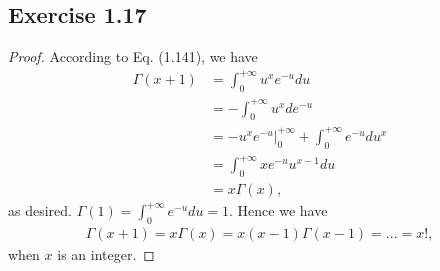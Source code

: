 \documentclass[11pt]{article}
\theoremstyle{definition}
\begin{document}
\subsection{Exercise 1.17}
\begin{proof}
According to Eq. (1.141), we have
\begin{align*}
\Gamma(x+1) &= \int^{+\infty}_0u^{x}e^{-u}du \\
&= -\int^{+\infty}_0u^{x}de^{-u}\\
&= \left.-u^xe^{-u}\right|^{+\infty}_0 + \int^{+\infty}_0e^{-u}du^x \\
&= \int^{+\infty}_0xe^{-u}u^{x-1}du\\
&= x\Gamma(x),
\end{align*}
as desired. $\Gamma(1) = \int^{+\infty}_0e^{-u}du = 1$. Hence we have
\begin{align*}
\Gamma(x+1) = x\Gamma(x) = x(x-1)\Gamma(x-1) = ... = x!,
\end{align*}
when $x$ is an integer.
\end{proof}
\end{document}
